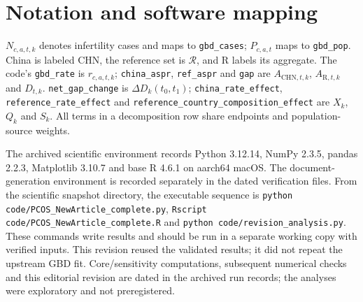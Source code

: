 \documentclass[11pt,a4paper]{article}
\begin{document}
\section*{Notation and software mapping}
$N_{c,a,t,k}$ denotes infertility cases and maps to \texttt{gbd\_cases}; $P_{c,a,t}$ maps to \texttt{gbd\_pop}. China is labeled $\mathrm{CHN}$, the reference set is $\mathcal{R}$, and $\mathrm{R}$ labels its aggregate. The code's \texttt{gbd\_rate} is $r_{c,a,t,k}$; \texttt{china\_aspr}, \texttt{ref\_aspr} and \texttt{gap} are $A_{\mathrm{CHN},t,k}$, $A_{\mathrm{R},t,k}$ and $D_{t,k}$. \texttt{net\_gap\_change} is $\Delta D_k(t_0,t_1)$; \texttt{china\_rate\_effect}, \texttt{reference\_rate\_effect} and \texttt{reference\_country\_composition\_effect} are $X_k$, $Q_k$ and $S_k$. All terms in a decomposition row share endpoints and population-source weights.

The archived scientific environment records Python 3.12.14, NumPy 2.3.5, pandas 2.2.3, Matplotlib 3.10.7 and base R 4.6.1 on aarch64 macOS. The document-generation environment is recorded separately in the dated verification files. From the scientific snapshot directory, the executable sequence is \texttt{python code/PCOS\_NewArticle\_complete.py}, \texttt{Rscript code/PCOS\_NewArticle\_complete.R} and \texttt{python code/revision\_analysis.py}. These commands write results and should be run in a separate working copy with verified inputs. This revision reused the validated results; it did not repeat the upstream GBD fit. Core/sensitivity computations, subsequent numerical checks and this editorial revision are dated in the archived run records; the analyses were exploratory and not preregistered.
\end{document}
